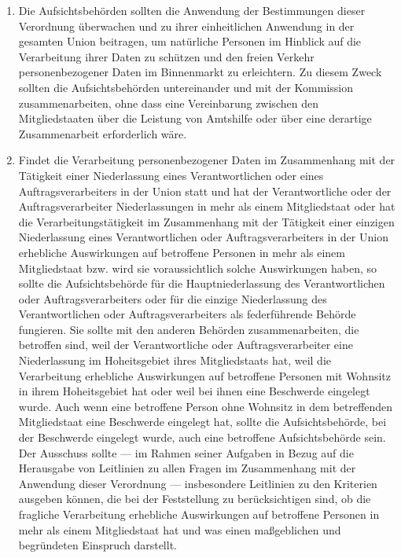 \begin{enumerate}

   \item Die Aufsichtsbehörden sollten die Anwendung der Bestimmungen dieser Verordnung überwachen und zu ihrer
    einheitlichen Anwendung in der gesamten Union beitragen, um natürliche Personen im Hinblick auf die Verarbeitung
    ihrer Daten zu schützen und den freien Verkehr personenbezogener Daten im Binnenmarkt zu erleichtern. Zu diesem
    Zweck sollten die Aufsichtsbehörden untereinander und mit der Kommission zusammenarbeiten, ohne dass eine
    Vereinbarung zwischen den Mitgliedstaaten über die Leistung von Amtshilfe oder über eine derartige Zusammenarbeit
    erforderlich wäre.%
   \label{itm:eg-123}
   

   \item Findet die Verarbeitung personenbezogener Daten im Zusammenhang mit der Tätigkeit einer Niederlassung eines
    Verantwortlichen oder eines Auftragsverarbeiters in der Union statt und hat der Verantwortliche oder der
    Auftragsverarbeiter Niederlassungen in mehr als einem Mitgliedstaat oder hat die Verarbeitungstätigkeit im
    Zusammenhang mit der Tätigkeit einer einzigen Niederlassung eines Verantwortlichen oder Auftragsverarbeiters in der
    Union erhebliche Auswirkungen auf betroffene Personen in mehr als einem Mitgliedstaat bzw. wird sie voraussichtlich
    solche Auswirkungen haben, so sollte die Aufsichtsbehörde für die Hauptniederlassung des Verantwortlichen oder
    Auftragsverarbeiters oder für die einzige Niederlassung des Verantwortlichen oder Auftragsverarbeiters als
    federführende Behörde fungieren. Sie sollte mit den anderen Behörden zusammenarbeiten, die betroffen sind, weil der
    Verantwortliche oder Auftragsverarbeiter eine Niederlassung im Hoheitsgebiet ihres Mitgliedstaats hat, weil die
    Verarbeitung erhebliche Auswirkungen auf betroffene Personen mit Wohnsitz in ihrem Hoheitsgebiet hat oder weil bei
    ihnen eine Beschwerde eingelegt wurde. Auch wenn eine betroffene Person ohne Wohnsitz in dem betreffenden
    Mitgliedstaat eine Beschwerde eingelegt hat, sollte die Aufsichtsbehörde, bei der Beschwerde eingelegt wurde, auch
    eine betroffene Aufsichtsbehörde sein. Der Ausschuss sollte — im Rahmen seiner Aufgaben in Bezug auf die Herausgabe
    von Leitlinien zu allen Fragen im Zusammenhang mit der Anwendung dieser Verordnung — insbesondere Leitlinien zu den
    Kriterien ausgeben können, die bei der Feststellung zu berücksichtigen sind, ob die fragliche Verarbeitung
    erhebliche Auswirkungen auf betroffene Personen in mehr als einem Mitgliedstaat hat und was einen maßgeblichen und
    begründeten Einspruch darstellt.%
   \label{itm:eg-124}
   

\end{enumerate}
